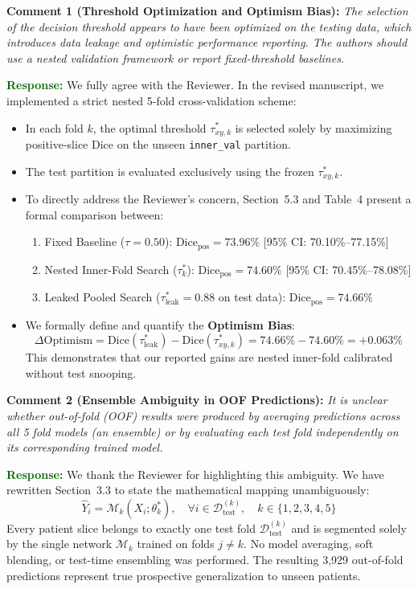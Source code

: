 \documentclass[11pt]{article}
\newcommand{\commentbox}[2]{%
\vspace{0.42em}\noindent
\textbf{\textcolor{NavyBlue}{#1:}} \textit{#2}\vspace{0.18em}%
}
\newcommand{\responsebox}[1]{%
\noindent
\textbf{\textcolor{DarkGreen}{Response:}} #1\vspace{0.42em}%
}
\begin{document}
\commentbox{Comment 1 (Threshold Optimization and Optimism Bias)}{The selection of the decision threshold appears to have been optimized on the testing data, which introduces data leakage and optimistic performance reporting. The authors should use a nested validation framework or report fixed-threshold baselines.}
\responsebox{We fully agree with the Reviewer. In the revised manuscript, we implemented a strict nested 5-fold cross-validation scheme:
\begin{itemize}
    \item In each fold $k$, the optimal threshold $\tau_{xy, k}^*$ is selected solely by maximizing positive-slice Dice on the unseen \texttt{inner\_val} partition.
    \item The test partition is evaluated exclusively using the frozen $\tau_{xy, k}^*$.
    \item To directly address the Reviewer's concern, Section~5.3 and Table~4 present a formal comparison between:
    \begin{enumerate}
        \item Fixed Baseline ($\tau=0.50$): $\text{Dice}_{\text{pos}} = 73.96\%$ [95\% CI: 70.10\%--77.15\%]
        \item Nested Inner-Fold Search ($\tau_k^*$): $\text{Dice}_{\text{pos}} = 74.60\%$ [95\% CI: 70.45\%--78.08\%]
        \item Leaked Pooled Search ($\tau_{\text{leak}}^* = 0.88$ on test data): $\text{Dice}_{\text{pos}} = 74.66\%$
    \end{enumerate}
    \item We formally define and quantify the \textbf{Optimism Bias}:
    \begin{equation*}
    \Delta\text{Optimism} = \text{Dice}(\tau_{\text{leak}}^*) - \text{Dice}(\tau_{xy, k}^*) = 74.66\% - 74.60\% = +0.063\%
    \end{equation*}
    This demonstrates that our reported gains are nested inner-fold calibrated without test snooping.
\end{itemize}
}

\commentbox{Comment 2 (Ensemble Ambiguity in OOF Predictions)}{It is unclear whether out-of-fold (OOF) results were produced by averaging predictions across all 5 fold models (an ensemble) or by evaluating each test fold independently on its corresponding trained model.}
\responsebox{We thank the Reviewer for highlighting this ambiguity. We have rewritten Section~3.3 to state the mathematical mapping unambiguously:
\begin{equation}
\hat{Y}_i = \mathcal{M}_k(X_i; \theta_k^*), \quad \forall i \in \mathcal{D}_{\text{test}}^{(k)}, \quad k \in \{1, 2, 3, 4, 5\}
\end{equation}
Every patient slice belongs to exactly one test fold $\mathcal{D}_{\text{test}}^{(k)}$ and is segmented solely by the single network $\mathcal{M}_k$ trained on folds $j \neq k$. No model averaging, soft blending, or test-time ensembling was performed. The resulting 3,929 out-of-fold predictions represent true prospective generalization to unseen patients.}
\end{document}
